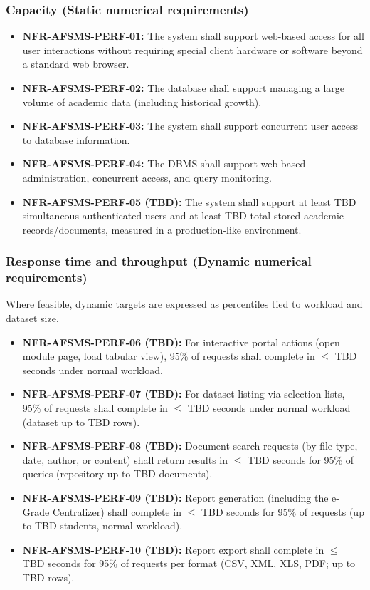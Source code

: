 \documentclass[11pt, a4paper]{article}
\begin{document}
\subsubsection{Capacity (Static numerical requirements)}
\begin{itemize}
    \item \textbf{NFR-AFSMS-PERF-01:} The system shall support web-based access for all user interactions without requiring special client hardware or software beyond a standard web browser.
    \item \textbf{NFR-AFSMS-PERF-02:} The database shall support managing a large volume of academic data (including historical growth).
    \item \textbf{NFR-AFSMS-PERF-03:} The system shall support concurrent user access to database information.
    \item \textbf{NFR-AFSMS-PERF-04:} The DBMS shall support web-based administration, concurrent access, and query monitoring.
    \item \textbf{NFR-AFSMS-PERF-05 (TBD):} The system shall support at least TBD simultaneous authenticated users and at least TBD total stored academic records/documents, measured in a production-like environment.
\end{itemize}

\subsubsection{Response time and throughput (Dynamic numerical requirements)}
Where feasible, dynamic targets are expressed as percentiles tied to workload and dataset size.
\begin{itemize}
    \item \textbf{NFR-AFSMS-PERF-06 (TBD):} For interactive portal actions (open module page, load tabular view), 95\% of requests shall complete in $\leq$ TBD seconds under normal workload.
    \item \textbf{NFR-AFSMS-PERF-07 (TBD):} For dataset listing via selection lists, 95\% of requests shall complete in $\leq$ TBD seconds under normal workload (dataset up to TBD rows).
    \item \textbf{NFR-AFSMS-PERF-08 (TBD):} Document search requests (by file type, date, author, or content) shall return results in $\leq$ TBD seconds for 95\% of queries (repository up to TBD documents).
    \item \textbf{NFR-AFSMS-PERF-09 (TBD):} Report generation (including the e-Grade Centralizer) shall complete in $\leq$ TBD seconds for 95\% of requests (up to TBD students, normal workload).
    \item \textbf{NFR-AFSMS-PERF-10 (TBD):} Report export shall complete in $\leq$ TBD seconds for 95\% of requests per format (CSV, XML, XLS, PDF; up to TBD rows).
\end{itemize}
\end{document}

